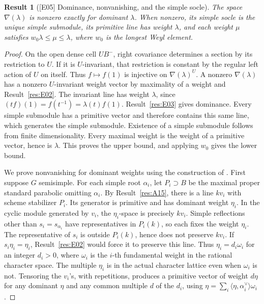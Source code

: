 \documentclass[11pt,a4paper,openany,oneside]{book}
\theoremstyle{resultstyle}
\newtheorem{statement}{Result}[chapter]
\newenvironment{result}[2]{\clubpenalty=10000\begin{statement}[\textnormal{[#1]} #2]\leavevmode\label{res:#1}\ignorespaces}{\end{statement}}
\theoremstyle{definition}
\numberwithin{equation}{chapter}
\begin{document}
\begin{result}{E05}{Dominance, nonvanishing, and the simple socle}
The space \(\nabla(\lambda)\) is nonzero exactly for dominant \(\lambda\). When nonzero, its simple socle is the unique simple submodule, its primitive line has weight \(\lambda\), and each weight \(\mu\) satisfies \(w_0\lambda\leq\mu\leq\lambda\), where \(w_0\) is the longest Weyl element.
\end{result}
\begin{proof}
On the open dense cell \(UB^-\), right covariance determines a section by its restriction to \(U\). If it is \(U\)-invariant, that restriction is constant by the regular left action of \(U\) on itself. Thus \(f\mapsto f(1)\) is injective on \(\nabla(\lambda)^U\). A nonzero \(\nabla(\lambda)\) has a nonzero \(U\)-invariant weight vector by maximality of a weight and Result~\ref{res:E02}. The invariant line has weight \(\lambda\), since \((t f)(1)=f(t^{-1})=\lambda(t)f(1)\). Result~\ref{res:E03} gives dominance. Every simple submodule has a primitive vector and therefore contains this same line, which generates the simple submodule. Existence of a simple submodule follows from finite dimensionality. Every maximal weight is the weight of a primitive vector, hence is \(\lambda\). This proves the upper bound, and applying \(w_0\) gives the lower bound.

We prove nonvanishing for dominant weights using the construction of \cite[22.23--22.27]{milne}. First suppose \(G\) semisimple. For each simple root \(\alpha_i\), let \(P_i\supset B\) be the maximal proper standard parabolic omitting \(\alpha_i\). By Result~\ref{res:A15}, there is a line \(kv_i\) with scheme stabilizer \(P_i\). Its generator is primitive and has dominant weight \(\eta_i\). In the cyclic module generated by \(v_i\), the \(\eta_i\)-space is precisely \(kv_i\). Simple reflections other than \(s_i=s_{\alpha_i}\) have representatives in \(P_i(k)\), so each fixes the weight \(\eta_i\). The representative of \(s_i\) is outside \(P_i(k)\), hence does not preserve \(kv_i\). If \(s_i\eta_i=\eta_i\), Result~\ref{res:E02} would force it to preserve this line. Thus \(\eta_i=d_i\omega_i\) for an integer \(d_i>0\), where \(\omega_i\) is the \(i\)-th fundamental weight in the rational character space. The multiple \(\eta_i\) is in the actual character lattice even when \(\omega_i\) is not. Tensoring the \(v_i\)'s, with repetitions, produces a primitive vector of weight \(d\eta\) for any dominant \(\eta\) and any common multiple \(d\) of the \(d_i\), using \(\eta=\sum_i \langle\eta,\alpha_i^\vee\rangle\omega_i\).


\end{proof}
\end{document}
